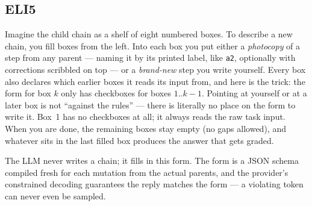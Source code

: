 \documentclass[11pt]{article}
\newenvironment{eli5}
  {\par\medskip\noindent\begin{lrbox}{\eliBox}\begin{minipage}{\dimexpr\linewidth-2\fboxsep-2\fboxrule}\small}
  {\end{minipage}\end{lrbox}\noindent\fcolorbox{accent!40}{accent!4}{\usebox{\eliBox}}\par\medskip}
\begin{document}
\subsection{ELI5}
\begin{eli5}
Imagine the child chain as a shelf of eight numbered boxes. To describe a new chain, you
fill boxes from the left. Into each box you put either a \emph{photocopy} of a step from any
parent --- naming it by its printed label, like \texttt{a2}, optionally with corrections
scribbled on top --- or a \emph{brand-new} step you write yourself. Every box also declares
which earlier boxes it reads its input from, and here is the trick: the form for box $k$
only has checkboxes for boxes $1..k-1$. Pointing at yourself or at a later box is not
``against the rules'' --- there is literally no place on the form to write it. Box~1 has no
checkboxes at all; it always reads the raw task input. When you are done, the remaining
boxes stay empty (no gaps allowed), and whatever sits in the last filled box produces the
answer that gets graded.
\end{eli5}
\noindent
The LLM never writes a chain; it fills in this form. The form is a JSON schema compiled
fresh for each mutation from the actual parents, and the provider's constrained decoding
guarantees the reply matches the form --- a violating token can never even be sampled.
\end{document}

